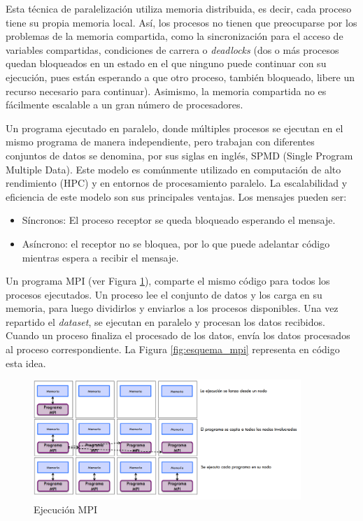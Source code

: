	\newpage

	Esta técnica de paralelización utiliza memoria distribuida, es decir, cada proceso tiene su propia memoria local. Así, los procesos no tienen que preocuparse por los problemas de la memoria compartida, como la sincronización para el acceso de variables compartidas, condiciones de carrera o \textit{deadlocks} (dos o más procesos quedan bloqueados en un estado en el que ninguno puede continuar con su ejecución, pues están esperando a que otro proceso, también bloqueado, libere un recurso necesario para continuar). Asimismo, la memoria compartida no es fácilmente escalable a un gran número de procesadores\cite{jjruiz2016compartida}.


	Un programa ejecutado en paralelo, donde múltiples procesos se ejecutan en el mismo programa de manera independiente, pero trabajan con diferentes conjuntos de datos se denomina, por sus siglas en inglés, SPMD (Single Program Multiple Data). Este modelo es comúnmente utilizado en computación de alto rendimiento (HPC) y en entornos de procesamiento paralelo. La escalabilidad y eficiencia de este modelo son sus principales ventajas. Los mensajes pueden ser:
	\begin{itemize}
		\item Síncronos: El proceso receptor se queda bloqueado esperando el mensaje.
		\item Asíncrono: el receptor no se bloquea, por lo que puede adelantar código mientras espera a recibir el mensaje.		
	\end{itemize}

	
	Un programa MPI (ver Figura \ref{fig:ejecucion_mpi}), comparte el mismo código para todos los procesos ejecutados. Un proceso lee el conjunto de datos y los carga en su memoria, para luego dividirlos y enviarlos a los procesos disponibles. Una vez repartido el \textit{dataset}, se ejecutan en paralelo y procesan los datos recibidos. Cuando un proceso finaliza el procesado de los datos, envía los datos procesados al proceso correspondiente. La Figura \ref{fig:esquema_mpi} representa en código esta idea.
	
	\vspace{-0.2cm}
	
	\begin{figure}[!h]
		\centering
		\includegraphics[width=0.90\textwidth]{images/chapter_2/mpi_2}
		\caption{Ejecución MPI}
		\label{fig:ejecucion_mpi}
	\end{figure}
	
